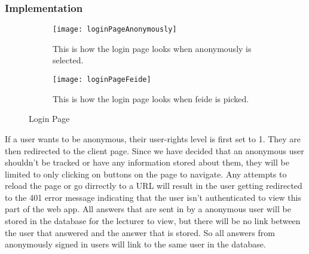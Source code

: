 \subsubsection{Implementation}
\begin{figure}[h]
    \centering
    \begin{subfigure}{0.45\linewidth}
        \texttt{[image: loginPageAnonymously]}
        \caption{This is how the login page looks when anonymously is selected.}
        \label{fig:loginPageAnonoumsly}
    \end{subfigure}
    \begin{subfigure}{0.45\linewidth}
        \texttt{[image: loginPageFeide]}
        \caption{This is how the login page looks when feide is picked.}
        \label{fig:loginPageFeide}
    \end{subfigure}
    \caption{Login Page}
    \label{fig:loginPage}
\end{figure}
\noindent
If a user wants to be anonymous, their user-rights level is first set to 1. They are then redirected to the client page. Since we have decided that an anonymous user shouldn't be tracked or have any information stored about them, they will be limited to only clicking on buttons on the page to navigate. Any attempts to reload the page or go dirrectly to a URL will result in the user getting redirected to the 401 error message indicating that the user isn't authenticated to view this part of the web app. All answers that are sent in by a anonymous user will be stored in the database for the lecturer to view, but there will be no link between the user that answered and the answer that is stored. So all answers from anonymously signed in users will link to the same user in the database.
\\[11pt]
